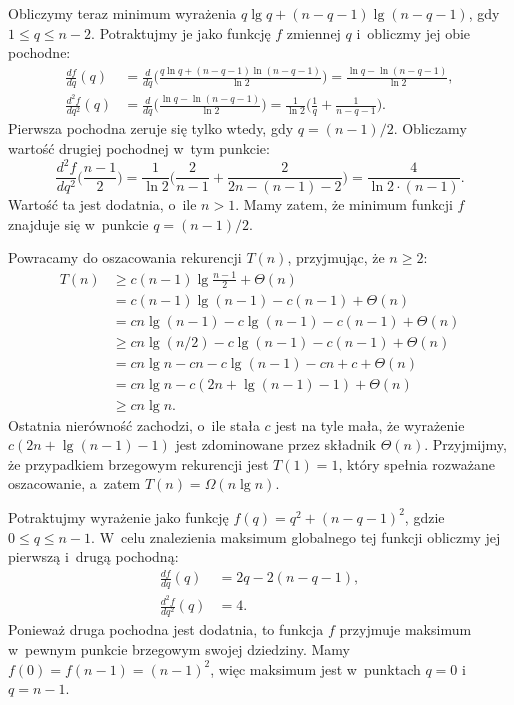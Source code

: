 Obliczymy teraz minimum wyrażenia $q\lg q+(n-q-1)\lg(n-q-1)$, gdy $1\le q\le n-2$. Potraktujmy je jako funkcję $f$ zmiennej $q$ i~obliczmy jej obie pochodne:
\begin{align*}
    \frac{df}{dq}(q) &= \frac{d}{dq}\biggl(\frac{q\ln q+(n-q-1)\ln(n-q-1)}{\ln2}\biggr) = \frac{\ln q-\ln(n-q-1)}{\ln2}, \\[1mm]
	\frac{d^2\!f}{dq^2}(q) &= \frac{d}{dq}\biggl(\frac{\ln q-\ln(n-q-1)}{\ln2}\biggr) = \frac{1}{\ln2}\biggl(\frac{1}{q}+\frac{1}{n-q-1}\biggr).
\end{align*}
Pierwsza pochodna zeruje się tylko wtedy, gdy $q=(n-1)/2$. Obliczamy wartość drugiej pochodnej w~tym punkcie:
\[
    \frac{d^2\!f}{dq^2}\biggl(\frac{n-1}{2}\biggr) = \frac{1}{\ln2}\biggl(\frac{2}{n-1}+\frac{2}{2n-(n-1)-2}\biggr) = \frac{4}{\ln2\cdot(n-1)}.
\]
Wartość ta jest dodatnia, o~ile $n>1$. Mamy zatem, że minimum funkcji $f$ znajduje się w~punkcie $q=(n-1)/2$.

Powracamy do oszacowania rekurencji $T(n)$, przyjmując, że $n\ge2$:
\begin{align*}
    T(n) &\ge c(n-1)\lg\frac{n-1}{2}+\Theta(n) \\
	&= c(n-1)\lg(n-1)-c(n-1)+\Theta(n) \\
	&= cn\lg(n-1)-c\lg(n-1)-c(n-1)+\Theta(n) \\
	&\ge cn\lg(n/2)-c\lg(n-1)-c(n-1)+\Theta(n) \\
	&= cn\lg n-cn-c\lg(n-1)-cn+c+\Theta(n) \\
	&= cn\lg n-c(2n+\lg(n-1)-1)+\Theta(n) \\
	&\ge cn\lg n.
\end{align*}
Ostatnia nierówność zachodzi, o~ile stała $c$ jest na tyle mała, że wyrażenie $c(2n+\lg(n-1)-1)$ jest zdominowane przez składnik $\Theta(n)$. Przyjmijmy, że przypadkiem brzegowym rekurencji jest $T(1)=1$, który spełnia rozważane oszacowanie, a~zatem $T(n)=\Omega(n\lg n)$.

\exercise %
Potraktujmy wyrażenie jako funkcję $f(q)=q^2+(n-q-1)^2$, gdzie $0\le q\le n-1$. W~celu znalezienia maksimum globalnego tej funkcji obliczmy jej pierwszą i~drugą pochodną:
\begin{align*}
    \frac{df}{dq}(q) &= 2q-2(n-q-1), \\
	\frac{d^2\!f}{dq^2}(q) &= 4.
\end{align*}
Ponieważ druga pochodna jest dodatnia, to funkcja $f$ przyjmuje maksimum w~pewnym punkcie brzegowym swojej dziedziny. Mamy $f(0)=f(n-1)=(n-1)^2$, więc maksimum jest w~punktach $q=0$ i~$q=n-1$. 

